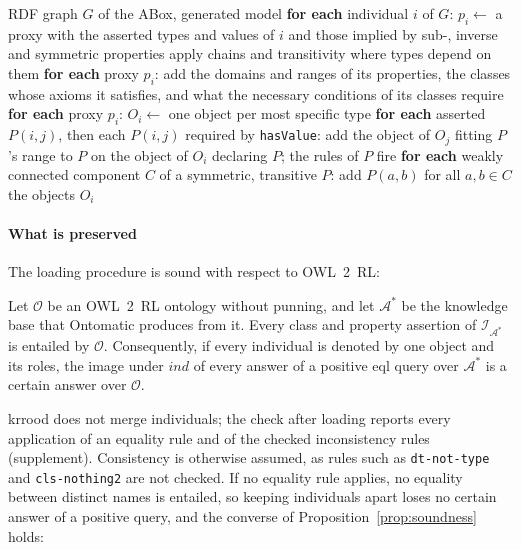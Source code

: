 \documentclass[sigconf,anonymous]{aamas}
\begin{document}
\begin{algorithm}[t]
\caption{ABox loading in Ontomatic (\texttt{OwlLoader.load}).}
\label{alg:loading}
\footnotesize
\begin{algorithmic}[1]
\Require RDF graph $G$ of the ABox, generated model
\State \textbf{for each} individual $i$ of $G$: $p_i \gets$ a proxy with the asserted types and values of $i$ and those implied by sub-, inverse and symmetric properties 
\Repeat {}
  \State apply chains and transitivity where types depend on them
  \State \textbf{for each} proxy $p_i$: add the domains and ranges of its properties, the classes whose axioms it satisfies, and what the necessary conditions of its classes require
\State \textbf{for each} proxy $p_i$: $O_i \gets$ one object per most specific type 
\State \textbf{for each} asserted $P(i,j)$, then each $P(i,j)$ required by \texttt{hasValue}: add the object of $O_j$ fitting $P$'s range to $P$ on the object of $O_i$ declaring $P$; the rules of $P$ fire 
\State \textbf{for each} weakly connected component $C$ of a symmetric, transitive $P$: add $P(a,b)$ for all $a, b \in C$ 
\State \Return the objects $O_i$
\end{algorithmic}
\end{algorithm}

\paragraph{What is preserved}
The loading procedure is sound with respect to OWL~2~RL:

\begin{proposition}[Soundness]
\label{prop:soundness}
Let $\mathcal{O}$ be an OWL~2~RL ontology without punning, and let $\mathcal{A}^*$ be the knowledge base that Ontomatic produces from it. Every class and property assertion of $\mathcal{I}_{\mathcal{A}^*}$ is entailed by $\mathcal{O}$. Consequently, if every individual is denoted by one object and its roles, the image under $\mathit{ind}$ of every answer of a positive \acs{eql} query over $\mathcal{A}^*$ is a certain answer over $\mathcal{O}$.
\end{proposition}

\ac{krrood} does not merge individuals; the check after loading reports every application of an equality rule and of the checked inconsistency rules (supplement). Consistency is otherwise assumed, as rules such as \texttt{dt-not-type} and \texttt{cls-nothing2} are not checked. If no equality rule applies, no equality between distinct names is entailed, so keeping individuals apart loses no certain answer of a positive query, and the converse of Proposition~\ref{prop:soundness} holds:
\end{document}
